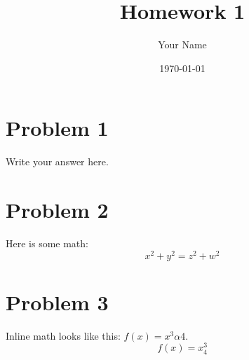 \documentclass[12pt]{article}
\title{Homework 1}
\author{Your Name}
\date{\today}
\begin{document}
\maketitle

\section*{Problem 1}
Write your answer here.

\section*{Problem 2}
Here is some math:
\[
x^2 + y^2 = z^2 + w^2
\]

\section*{Problem 3}
Inline math looks like this: \( f(x) = x^3 \alpha 4\).
\[ f(x) = x^3_4\]
\end{document}
